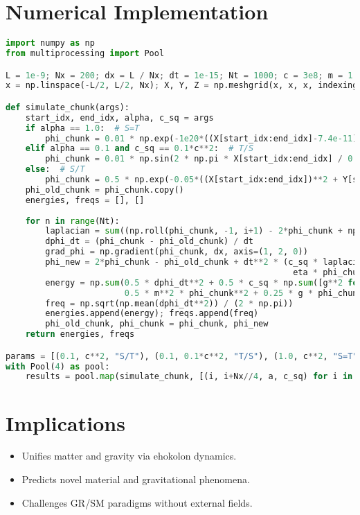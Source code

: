 \documentclass{article}
\begin{document}
\section{Numerical Implementation}
\begin{lstlisting}[language=Python, caption=Ehokolon Matter and Gravity Simulation, label=lst:mattergravity]
import numpy as np
from multiprocessing import Pool

L = 1e-9; Nx = 200; dx = L / Nx; dt = 1e-15; Nt = 1000; c = 3e8; m = 1.0; g = 0.1; eta = 0.01; k = 0.01
x = np.linspace(-L/2, L/2, Nx); X, Y, Z = np.meshgrid(x, x, x, indexing='ij')

def simulate_chunk(args):
    start_idx, end_idx, alpha, c_sq = args
    if alpha == 1.0:  # S=T
        phi_chunk = 0.01 * np.exp(-1e20*((X[start_idx:end_idx]-7.4e-11)**2 + Y[start_idx:end_idx]**2 + Z[start_idx:end_idx]**2))
    elif alpha == 0.1 and c_sq == 0.1*c**2:  # T/S
        phi_chunk = 0.01 * np.sin(2 * np.pi * X[start_idx:end_idx] / 0.5)
    else:  # S/T
        phi_chunk = 0.5 * np.exp(-0.05*((X[start_idx:end_idx])**2 + Y[start_idx:end_idx]**2 + Z[start_idx:end_idx]**2))
    phi_old_chunk = phi_chunk.copy()
    energies, freqs = [], []
    
    for n in range(Nt):
        laplacian = sum((np.roll(phi_chunk, -1, i+1) - 2*phi_chunk + np.roll(phi_chunk, 1, i+1)) / dx**2 for i in range(2))
        dphi_dt = (phi_chunk - phi_old_chunk) / dt
        grad_phi = np.gradient(phi_chunk, dx, axis=(1, 2, 0))
        phi_new = 2*phi_chunk - phi_old_chunk + dt**2 * (c_sq * laplacian - m**2 * phi_chunk - g * phi_chunk**3 - 
                                                          eta * phi_chunk**5 + 8 * np.pi * 6.674e-11 * k * phi_chunk**2)
        energy = np.sum(0.5 * dphi_dt**2 + 0.5 * c_sq * np.sum([g**2 for g in grad_phi], 0) + 
                        0.5 * m**2 * phi_chunk**2 + 0.25 * g * phi_chunk**4 + 0.1667 * eta * phi_chunk**6) * dx**3 * 1.602e-19
        freq = np.sqrt(np.mean(dphi_dt**2)) / (2 * np.pi))
        energies.append(energy); freqs.append(freq)
        phi_old_chunk, phi_chunk = phi_chunk, phi_new
    return energies, freqs

params = [(0.1, c**2, "S/T"), (0.1, 0.1*c**2, "T/S"), (1.0, c**2, "S=T")]
with Pool(4) as pool:
    results = pool.map(simulate_chunk, [(i, i+Nx//4, a, c_sq) for i in range(0, Nx, Nx//4) for a, c_sq, _ in params])
\end{lstlisting}

\section{Implications}
\begin{itemize}
    \item Unifies matter and gravity via ehokolon dynamics.
    \item Predicts novel material and gravitational phenomena.
    \item Challenges GR/SM paradigms without external fields.
\end{itemize}
\end{document}
